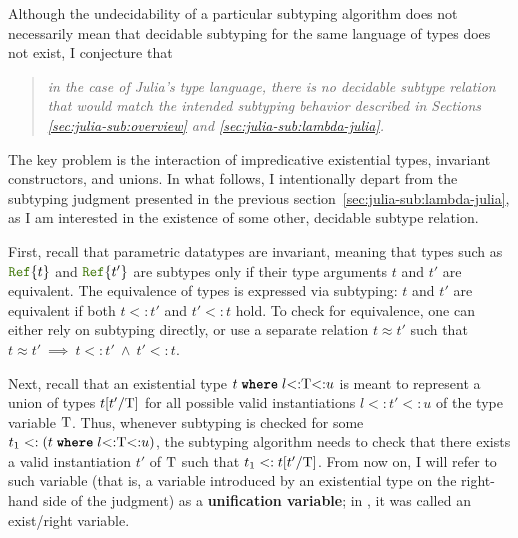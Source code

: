 Although the undecidability of a particular subtyping algorithm
does not necessarily mean that decidable subtyping for the same
language of types does not exist, I {conjecture} that
\begin{quotation}\emph{
  in the case of Julia's type language, there is no decidable subtype relation 
  that would match the intended subtyping behavior
  described in Sections \ref{sec:julia-sub:overview} and
  \ref{sec:julia-sub:lambda-julia}.
}\end{quotation}
The key problem is the interaction of
impredicative existential types, invariant constructors, and unions.
In what follows, I intentionally depart from the subtyping judgment
presented in the previous section~\ref{sec:julia-sub:lambda-julia},
as I am interested in the existence of some other, decidable subtype relation.

First, recall that parametric datatypes are invariant, meaning that
types such as $\reftyp{t}$ and $\reftyp{t'}$ are subtypes
only if their type arguments $t$ and $t'$ are equivalent.
The equivalence of types is expressed via subtyping:
$t$ and $t'$ are equivalent
if both $t <: t'$ and $t' <: t$ hold.
To check for equivalence, one can either rely on subtyping directly,
or use a separate relation $t \approx t'$ such that 
$t \approx t' \ \implies\ t <: t'\ \land\ t' <: t$.

Next, recall that an existential type $t\;\textbf{\texttt{where}}\;l{<:}\mathrm{T}{<:}u$ is meant to 
represent a union of types $t[t'/\mathrm{T}]$ for all possible valid instantiations
$l <: t' <: u$ of the type variable $\mathrm{T}$.
Thus, whenever subtyping is checked for some 
$t_1 <: (t\;\textbf{\texttt{where}}\;l{<:}\mathrm{T}{<:}u)$, the subtyping algorithm needs to check that
there exists a valid instantiation $t'$ of $\mathrm{T}$ such that $t_1 <: t[t'/\mathrm{T}]$.
From now on, I will refer to such variable \T (that is, a variable introduced
by an existential type on the right-hand side of the judgment) as a
\textbf{unification variable}; in ,
it was called an exist/right variable.

